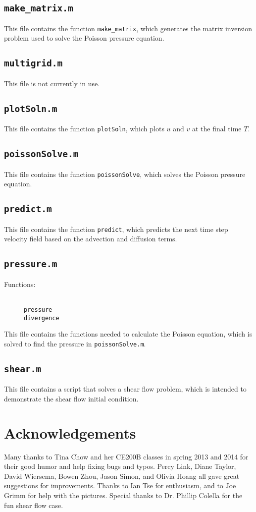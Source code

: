 \documentclass[12pt]{article}
\begin{document}
\subsection{\texttt{make\_matrix.m}}
This file contains the function \texttt{make\_matrix}, which generates the matrix inversion problem used to solve the Poisson pressure equation.

\subsection{\texttt{multigrid.m}}
This file is not currently in use.

\subsection{\texttt{plotSoln.m}}
This file contains the function \texttt{plotSoln}, which plots $u$ and $v$ at the final time $T$.

\subsection{\texttt{poissonSolve.m}}
This file contains the function \texttt{poissonSolve}, which solves the Poisson pressure equation.

\subsection{\texttt{predict.m}}
This file contains the function \texttt{predict}, which predicts the next time step velocity field based on the advection and diffusion terms.

\subsection{\texttt{pressure.m}}
\begin{description}
\item[Functions:] \hfill \\ \texttt{pressure} \\ \texttt{divergence} 
\end{description}
This file contains the functions needed to calculate the Poisson equation, which is solved to find the pressure in \texttt{poissonSolve.m}.

\subsection{\texttt{shear.m}}
This file contains a script that solves a shear flow problem, which is intended to demonstrate the shear flow initial condition.

\section{Acknowledgements}

Many thanks to Tina Chow and her CE200B classes in spring 2013 and 2014 for their good humor and help fixing bugs and typos.  Percy Link, Diane Taylor, David Wiersema, Bowen Zhou, Jason Simon, and Olivia Hoang all gave great suggestions for improvements.  Thanks to Ian Tse for enthusiasm, and to Joe Grimm for help with the pictures.  Special thanks to Dr. Phillip Colella for the fun shear flow case.
\end{document}
